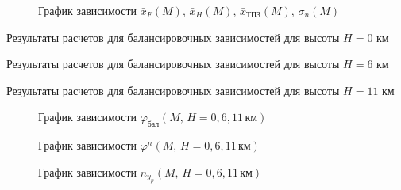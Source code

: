 \begin{figure}[H]
\centering
\resizebox{.79\linewidth}{!}{}
\caption{График зависимости $\bar{x}_{F}(M)$, $\bar{x}_{H}(M)$, $\bar{x}_{ТПЗ}(M)$, $\sigma_{n}(M)$}
\label{fig:xis_sigma}
\end{figure}


\begin{table}[H]
    \centering
    \caption{Результаты расчетов для балансировочных зависимостей для высоты
    $H=0$ км}
    \label{tab:phi_0}
    
\end{table}

\begin{table}[H]
    \centering
    \caption{Результаты расчетов для балансировочных зависимостей для высоты
    $H=6$ км}
    \label{tab:phi_6}
    
\end{table}

\begin{table}[H]
    \centering
    \caption{Результаты расчетов для балансировочных зависимостей для высоты
    $H=11$ км}
    \label{tab:phi_11}
    
\end{table}

\begin{minipage}{\textwidth}
\flushright 
\begin{figure}[H]
\centering
\resizebox{.79\linewidth}{!}{}
\caption{График зависимости $\varphi_{бал}(M,\, H=0,6,11\, \text{км})$}
\label{fig:phi_bal}
\end{figure}
\begin{figure}[H]
\centering
\resizebox{.79\linewidth}{!}{}
\caption{График зависимости $\varphi^{n}(M,\, H=0,6,11\, \text{км})$}
\label{fig:phi_n}
\end{figure}
\end{minipage}
\begin{figure}[H]
\centering
\resizebox{.79\linewidth}{!}{}
\caption{График зависимости $n_{y_{p}}(M,\, H = 0,6,11 \, км)$}
\label{fig:ny_p_graph}
\end{figure}

